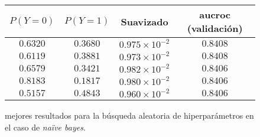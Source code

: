 \vspace{0.5em}
\begin{figure}[!htbp]
    \begin{center}
        \begin{tabular}{ |c|c|c|c| } 
         \hline
        $P(Y=0)$ & $P(Y=1)$ & Suavizado & aucroc (validación) \\
        \hline
        $0.6320$ & $0.3680$ & $0.975 \times 10^{-2}$ & $0.8408$ \\ 
        $0.6119$ & $0.3881$ & $0.973 \times 10^{-2}$ & $0.8408$  \\
        $0.6579$ & $0.3421$ & $0.982 \times 10^{-2}$ & $0.8406$  \\ 
        $0.8183$ & $0.1817$ & $0.980 \times 10^{-2}$ & $0.8406$  \\
        $0.5157$ & $0.4843$ & $0.960 \times 10^{-2}$ & $0.8406$  \\ 
        \hline
        \end{tabular}
    \end{center}
    \caption{mejores resultados para la búsqueda aleatoria de hiperparámetros en el caso de \textit{naïve bayes}.} \label{naive_bayes}
\end{figure}

